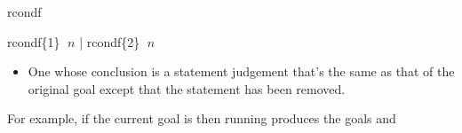 \begin{tactic}{rcondf}
\begin{tsyntax}{rcondf\{1\} $\;n$ | rcondf\{2\} $\;n$}
\begin{itemize}
    \item One whose conclusion is a \prhl statement judgement that's
      the same as that of the original goal except that the 
      statement has been removed.
    \end{itemize}

  \medskip
  For example, if the current goal is
   then
  running 
  produces the goals
  and
  \end{tsyntax}
\end{tactic}
